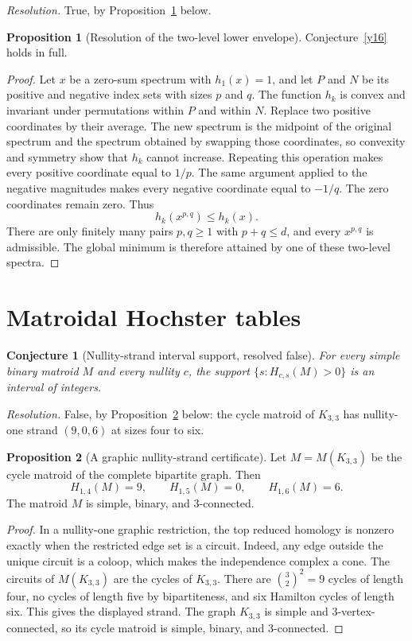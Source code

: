 \documentclass[11pt]{article}
\newtheorem{conjecture}{Conjecture}
\theoremstyle{definition}
\newtheorem{proposition}{Proposition}
\begin{document}
\emph{Resolution.} True, by Proposition~\ref{y:lower} below.

\begin{proposition}[Resolution of the two-level lower envelope]\label{y:lower}
Conjecture~\ref{y16} holds in full.
\end{proposition}

\begin{proof}
Let $x$ be a zero-sum spectrum with $h_1(x)=1$, and let $P$ and $N$ be its positive and negative index sets with sizes $p$ and $q$.  The function $h_k$ is convex and invariant under permutations within $P$ and within $N$.  Replace two positive coordinates by their average.  The new spectrum is the midpoint of the original spectrum and the spectrum obtained by swapping those coordinates, so convexity and symmetry show that $h_k$ cannot increase.  Repeating this operation makes every positive coordinate equal to $1/p$.  The same argument applied to the negative magnitudes makes every negative coordinate equal to $-1/q$.  The zero coordinates remain zero.  Thus
\[
h_k(x^{p,q})\le h_k(x).
\]
There are only finitely many pairs $p,q\ge1$ with $p+q\le d$, and every $x^{p,q}$ is admissible.  The global minimum is therefore attained by one of these two-level spectra.
\end{proof}

\section{Matroidal Hochster tables}

\begin{conjecture}[Nullity-strand interval support, resolved false]\label{y17}
For every simple binary matroid $M$ and every nullity $c$, the support $\{s:H_{c,s}(M)>0\}$ is an interval of integers.
\end{conjecture}

\emph{Resolution.} False, by Proposition~\ref{y:k33} below: the cycle matroid of $K_{3,3}$ has nullity-one strand $(9,0,6)$ at sizes four to six.

\begin{proposition}[A graphic nullity-strand certificate]\label{y:k33}
Let $M=M(K_{3,3})$ be the cycle matroid of the complete bipartite graph.  Then
\[
H_{1,4}(M)=9,\qquad H_{1,5}(M)=0,\qquad H_{1,6}(M)=6.
\]
The matroid $M$ is simple, binary, and $3$-connected.
\end{proposition}

\begin{proof}
In a nullity-one graphic restriction, the top reduced homology is nonzero exactly when the restricted edge set is a circuit.  Indeed, any edge outside the unique circuit is a coloop, which makes the independence complex a cone.  The circuits of $M(K_{3,3})$ are the cycles of $K_{3,3}$.  There are $\binom32^2=9$ cycles of length four, no cycles of length five by bipartiteness, and six Hamilton cycles of length six.  This gives the displayed strand.  The graph $K_{3,3}$ is simple and $3$-vertex-connected, so its cycle matroid is simple, binary, and $3$-connected.
\end{proof}
\end{document}
